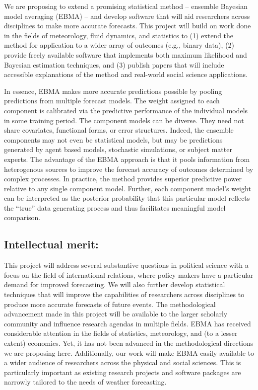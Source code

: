 \documentclass[pdftex,12pt,fullpage,oneside]{amsart}
\begin{document}
We are proposing to extend a promising statistical method -- ensemble
Bayesian model averaging (EBMA) -- and develop software that will aid
researchers across disciplines to make more accurate forecasts.  This
project will build on work done in the fields of meteorology, fluid
dynamics, and statistics to (1) extend the method for application to a
wider array of outcomes (e.g., binary data), (2) provide freely
available software that implements both maximum likelihood and
Bayesian estimation techniques, and (3) publish papers that will
include accessible explanations of the method and real-world social
science applications.

In essence, EBMA makes more accurate predictions possible by pooling
predictions from multiple forecast models. The weight assigned to each
component is calibrated via the predictive performance of the
individual models in some training period. The component models can be
diverse.  They need not share covariates, functional forms, or error
structures. Indeed, the ensemble components may not even be
statistical models, but may be predictions generated by agent based
models, stochastic simulations, or subject matter experts.  The
advantage of the EBMA approach is that it pools information from
heterogenous sources to improve the forecast accuracy of outcomes
determined by complex processes.  In practice, the method provides
superior predictive power relative to any single component
model. Further, each component model's weight can be interpreted as
the posterior probability that this particular model reflects the
``true'' data generating process and thus facilitates meaningful model
comparison.

\subsection*{Intellectual merit:} 
This project will address several substantive questions in political
science with a focus on the field of international relations, where policy makers have a particular demand for improved forecasting.  We will also further develop statistical techniques that will
improve the capabilities of researchers across disciplines to produce
more accurate forecasts of future events. The methodological
advancement made in this project will be available to the larger
scholarly community and influence research agendas in multiple fields.
EBMA has received considerable attention in the fields of statistics,
meteorology, and (to a lesser extent) economics.  Yet, it has not been
advanced in the methodological directions we are proposing here.
Additionally, our work will make EBMA easily available to a wider
audience of researchers across the physical and social sciences.  This
is particularly important as existing research projects and software packages
are narrowly tailored to the needs of weather forecasting.
\end{document}
